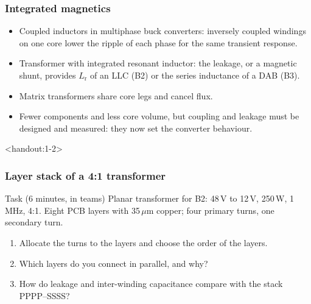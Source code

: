 \begin{frame}
	\frametitle{Integrated magnetics}
	\begin{itemize}
		\item Coupled inductors in multiphase buck converters: inversely coupled windings on one core lower the ripple of each phase for the same transient response.
		\item Transformer with integrated resonant inductor: the leakage, or a magnetic shunt, provides $L_\mathrm{r}$ of an LLC (B2) or the series inductance of a DAB (B3).
		\item Matrix transformers share core legs and cancel flux.
		\item Fewer components and less core volume, but coupling and leakage must be designed and measured: they now set the converter behaviour.
	\end{itemize}
\end{frame}

\begin{frame}<handout:1-2>
	\frametitle{Layer stack of a 4:1 transformer}
	\begin{block}{Task (6 minutes, in teams)}
		Planar transformer for B2: 48\,V to 12\,V, 250\,W, 1\,MHz, 4:1. Eight PCB layers with 35\,$\mu$m copper; four primary turns, one secondary turn.
		\begin{enumerate}
			\item Allocate the turns to the layers and choose the order of the layers.
			\item Which layers do you connect in parallel, and why?
			\item How do leakage and inter-winding capacitance compare with the stack PPPP--SSSS?
		\end{enumerate}
	\end{block}
\end{frame}

